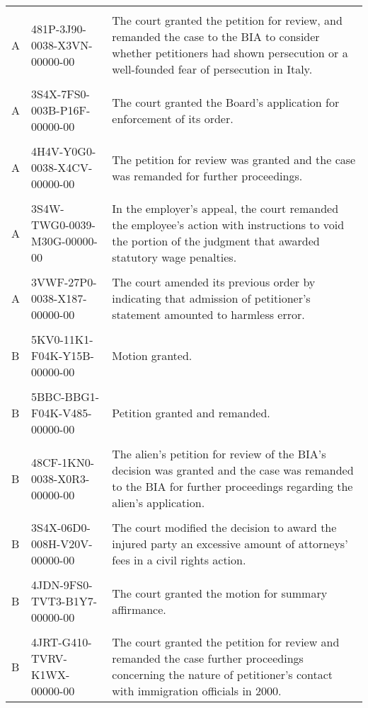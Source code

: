 \documentclass[10pt, letterpaper]{article}
\begin{document}
\begin{spacing}{1.0}
\begin{small}
\begin{longtable}[H]{llp{4in}}
    & &\\[-4pt]
    A & 481P-3J90-0038-X3VN-00000-00 & The court granted the petition for review, and remanded the case to the BIA to consider whether petitioners had shown persecution or a well-founded fear of persecution in Italy.\\
    & &\\[-4pt]
    A & 3S4X-7FS0-003B-P16F-00000-00 & The court granted the Board's application for enforcement of its order.\\
    & &\\[-4pt]
    A & 4H4V-Y0G0-0038-X4CV-00000-00 & The petition for review was granted and the case was remanded for further proceedings.\\
    & &\\[-4pt]
    A & 3S4W-TWG0-0039-M30G-00000-00 & In the employer's appeal, the court remanded the employee's action with instructions to void the portion of the judgment that awarded statutory wage penalties.\\
    & &\\[-4pt]
    A & 3VWF-27P0-0038-X187-00000-00 & The court amended its previous order by indicating that admission of petitioner's statement amounted to harmless error.\\
    & &\\[-4pt]
    B & 5KV0-11K1-F04K-Y15B-00000-00 & Motion granted.\\
    & &\\[-4pt]
    B & 5BBC-BBG1-F04K-V485-00000-00 & Petition granted and remanded.\\
    & &\\[-4pt]
    B & 48CF-1KN0-0038-X0R3-00000-00 & The alien's petition for review of the BIA's decision was granted and the case was remanded to the BIA for further proceedings regarding the alien's application.\\
    & &\\[-4pt]
    B & 3S4X-06D0-008H-V20V-00000-00 & The court modified the decision to award the injured party an excessive amount of attorneys' fees in a civil rights action.\\
    & &\\[-4pt]
    B & 4JDN-9FS0-TVT3-B1Y7-00000-00 & The court granted the motion for summary affirmance.\\
    & &\\[-4pt]
    B & 4JRT-G410-TVRV-K1WX-00000-00 & The court granted the petition for review and remanded the case further proceedings concerning the nature of petitioner's contact with immigration officials in 2000.\\

\end{longtable}
\end{small}
\end{spacing}
\end{document}
